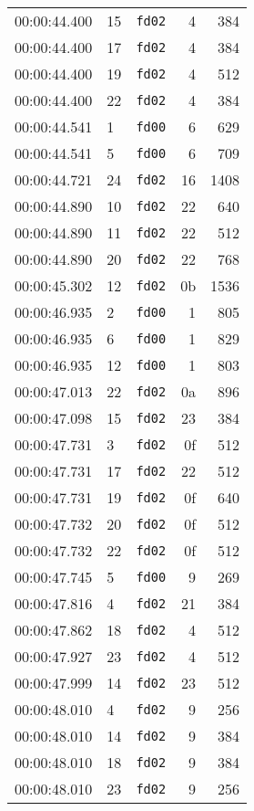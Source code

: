 \documentclass{article}
\begin{document}
\begin{longtable}{lllrr}
00:00:44.400 & 15 & \texttt{fd02} & 4 & 384 \\
00:00:44.400 & 17 & \texttt{fd02} & 4 & 384 \\
00:00:44.400 & 19 & \texttt{fd02} & 4 & 512 \\
00:00:44.400 & 22 & \texttt{fd02} & 4 & 384 \\
00:00:44.541 & 1 & \texttt{fd00} & 6 & 629 \\
00:00:44.541 & 5 & \texttt{fd00} & 6 & 709 \\
00:00:44.721 & 24 & \texttt{fd02} & 16 & 1408 \\
00:00:44.890 & 10 & \texttt{fd02} & 22 & 640 \\
00:00:44.890 & 11 & \texttt{fd02} & 22 & 512 \\
00:00:44.890 & 20 & \texttt{fd02} & 22 & 768 \\
00:00:45.302 & 12 & \texttt{fd02} & 0b & 1536 \\
00:00:46.935 & 2 & \texttt{fd00} & 1 & 805 \\
00:00:46.935 & 6 & \texttt{fd00} & 1 & 829 \\
00:00:46.935 & 12 & \texttt{fd00} & 1 & 803 \\
00:00:47.013 & 22 & \texttt{fd02} & 0a & 896 \\
00:00:47.098 & 15 & \texttt{fd02} & 23 & 384 \\
00:00:47.731 & 3 & \texttt{fd02} & 0f & 512 \\
00:00:47.731 & 17 & \texttt{fd02} & 22 & 512 \\
00:00:47.731 & 19 & \texttt{fd02} & 0f & 640 \\
00:00:47.732 & 20 & \texttt{fd02} & 0f & 512 \\
00:00:47.732 & 22 & \texttt{fd02} & 0f & 512 \\
00:00:47.745 & 5 & \texttt{fd00} & 9 & 269 \\
00:00:47.816 & 4 & \texttt{fd02} & 21 & 384 \\
00:00:47.862 & 18 & \texttt{fd02} & 4 & 512 \\
00:00:47.927 & 23 & \texttt{fd02} & 4 & 512 \\
00:00:47.999 & 14 & \texttt{fd02} & 23 & 512 \\
00:00:48.010 & 4 & \texttt{fd02} & 9 & 256 \\
00:00:48.010 & 14 & \texttt{fd02} & 9 & 384 \\
00:00:48.010 & 18 & \texttt{fd02} & 9 & 384 \\
00:00:48.010 & 23 & \texttt{fd02} & 9 & 256 \\

\end{longtable}
\end{document}
